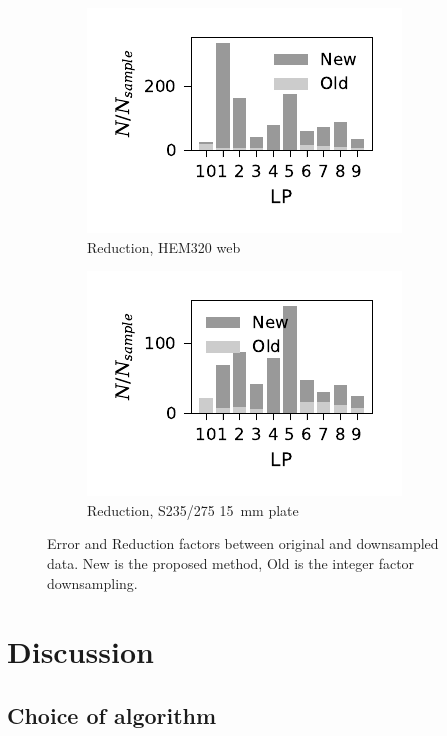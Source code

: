 \documentclass[a4paper,11pt]{article}
\begin{document}
\begin{figure}
    \begin{subfigure}[b]{0.45\linewidth}
        \centering
        \includegraphics{N_reduction_WP3_HEM320_C_CRM20.pdf}
        \caption{Reduction, HEM320 web}
        \label{fig:hem320-reduction}
    \end{subfigure}
    \begin{subfigure}[b]{0.45\linewidth}
        \centering
        \includegraphics{N_reduction_S235275_Plate15.pdf}
        \caption{Reduction, S235/275 15~mm plate}
        \label{fig:s235275-reduction}
    \end{subfigure}
    \caption{Error and Reduction factors between original and downsampled data. New is the proposed method, Old is the integer factor downsampling.}
\end{figure}

\section{Discussion}

\subsection{Choice of algorithm}
\end{document}
